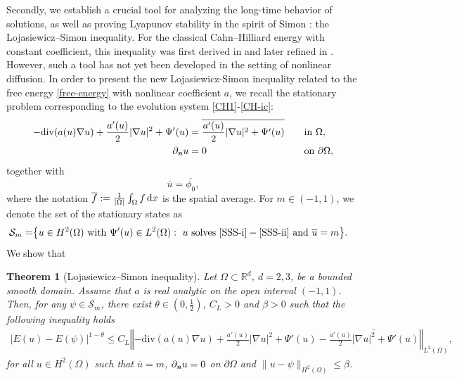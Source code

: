 \documentclass[11pt,reqno]{amsart}
\newtheorem{theorem}{Theorem}[section]
\theoremstyle{remark}
\newcommand \norm[1] {\left\Vert #1\right\Vert}
\def\n{\textbf{\textit{n}}}
\def\R{\mathbb{R}}
\def\d{{\rm d}}
\def\u{u}
\def\div{\mathrm{div}}
\numberwithin{equation}{section}
\def\d{{\rm d}}
\newcommand{\vp}{\phi}
\begin{document}
Secondly, we establish a crucial tool for analyzing the long-time behavior of solutions, as well as proving Lyapunov stability
in the spirit of Simon \cite{SIMON}: the Lojasiewicz–Simon inequality. For the classical Cahn–Hilliard energy with constant coefficient,
 this inequality was first derived in \cite{HR1999} and later refined in \cite{AW07}. However, such a tool has not yet been developed in the setting of nonlinear diffusion.
In order to present the new Lojasiewicz-Simon inequality related to the free energy \eqref{free-energy} with nonlinear coefficient $a$, we recall the stationary problem corresponding to the evolution system
\eqref{CH1}-\eqref{CH-ic}: %
\begin{alignat}{2}
\label{SSS-i}
-\div(a(\u)\nabla \u)+\frac{a'(\u)}{2} |\nabla \u|^2+\Psi'(\u)&=\overline{\frac{a'(\u)}{2} |\nabla \u|^2+\Psi'(\u)} \quad &&\text{in } \Omega, \\
\label{SSS-ii}
\partial_\n \u&=0 \quad &&\text{on } \partial \Omega,
\end{alignat}
together with
$$
\overline{\u}=\overline{\phi_0},
$$
where the notation $\overline{f}:=\frac{1}{|\Omega|}\int_\Omega f\,\d x$ is the spatial average.
For $m\in (-1,1)$, we denote the set of the stationary states as
\begin{align}
\mathcal{S}_m=&\big\lbrace \u\in H^2(\Omega) \text{ with }
\Psi'(\u) \in L^2(\Omega): \
\u \text{ solves } \eqref{SSS-i}-\eqref{SSS-ii} \text{ and } \overline{\u}=m
    \big\rbrace.\label{SSS1}
\end{align}
We show that
\begin{theorem}[Lojasiewicz--Simon inequality]
\label{LSg-intro}
Let $\Omega\subset\R^d$, $d=2,3$, be a bounded smooth domain. Assume that $a$ is real analytic on the open interval $(-1,1)$. Then, for any $\psi\in \mathcal{S}_m$, there exist $\theta\in (0, \frac12)$, $C_L>0$ and
$\beta >0$ such that the following inequality holds
\begin{align}
|E(u) -E(\psi)|^{1-\theta}\leq C_L \norm{-\div(a(u)\nabla u)+\frac{a'(u)}{2} |\nabla u|^2+\Psi'(u)-\overline{\frac{a'(u)}{2} |\nabla u|^2+\Psi'(u)}}_{L^2(\Omega)},\label{LS0}
\end{align}
for all $u\in H^2(\Omega)$ such that $\overline{u}=m$, $\partial_\n u=0$ on $\partial\Omega$ and $\|u-\psi\|_{H^2(\Omega)}\leq\beta$.
\end{theorem}
\end{document}
